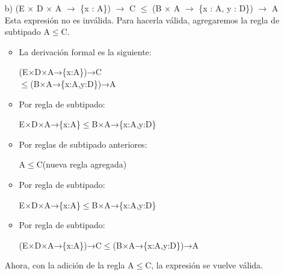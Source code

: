 \documentclass{article}
\begin{document}
\begin{itemize}
\begin{itemize}
            \item[b)] (E × D × A $\rightarrow$ \{x : A\}) $\rightarrow$ C $\leq$ (B × A $\rightarrow$ \{x : A, y : D\}) $\rightarrow$  A\\
            Esta expresión no es inválida. Para hacerla válida, agregaremos la regla de subtipado A$\leq$C. 
            \begin{itemize}
                \item La derivación formal es la siguiente:
                \item[ ] (E×D×A→\{x:A\})→C\\ $\leq$(B×A→\{x:A,y:D\})→A
                \item Por regla de subtipado:
                \item[ ] E×D×A→\{x:A\}$\leq$B×A→\{x:A,y:D\}
                \item Por reglas de subtipado anteriores:
                \item[ ] A$\leq$C(nueva regla agregada)
                \item Por regla de subtipado:
                \item[ ] E×D×A→\{x:A\}$\leq$B×A→\{x:A,y:D\}
                \item Por regla de subtipado:
                \item[ ] (E×D×A→\{x:A\})→C$\leq$(B×A→\{x:A,y:D\})→A
            \end{itemize}            
            Ahora, con la adición de la regla A$\leq$C, la expresión se vuelve válida. 
        \end{itemize}
    \end{itemize}
\end{document}
